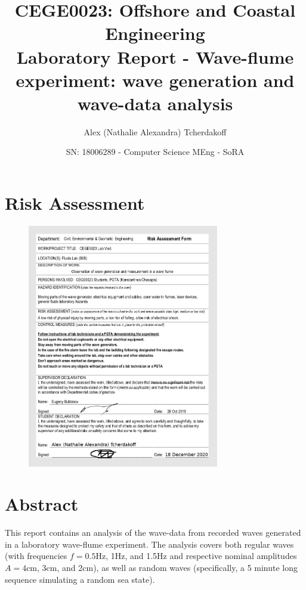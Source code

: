 \documentclass{article}
\title{CEGE0023: Offshore and Coastal Engineering\\
Laboratory Report - Wave-flume experiment: wave generation and wave-data analysis}
\author{Alex (Nathalie Alexandra) Tcherdakoff}
\date{SN: 18006289 - Computer Science MEng - SoRA}
\begin{document}
	\maketitle
	\section*{Risk Assessment}
	\begin{figure}[H]
		\centering
		\includegraphics[width=0.745\textwidth]{../graphs/RiskAssessment.png}
		\label{riskassessment}
	\end{figure}
	\section{Abstract}
	This report contains an analysis of the wave-data from recorded waves generated in a laboratory wave-flume experiment. The analysis covers both regular waves (with frequencies $f = 0.5$Hz, 1Hz, and 1.5Hz and respective nominal amplitudes $A = 4$cm, 3cm, and 2cm), as well as random waves (specifically, a 5 minute long sequence simulating a random sea state).
\end{document}
